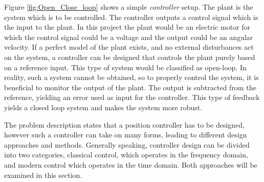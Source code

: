 \documentclass[../../main.tex]{subfiles}
\begin{document}
Figure \ref{fig:Open_Close_loop} shows a simple \textit{controller} setup.
The plant is the system which is to be controlled. The controller outputs a control signal which is the input to the plant. 
In this project the plant would be an electric motor for which the control signal could be a voltage and the output could be an angular velocity.
If a perfect model of the plant exists, and no external disturbances act on the system, a controller can be designed that controls the plant purely based on a reference input. This type of system would be classified as open-loop. In reality, such a system cannot be obtained, so to properly control the system, it is beneficial to monitor the output of the plant. The output is subtracted from the reference, yielding an error used as input for the controller. This type of feedback yields a closed loop system and makes the system more robust. 

The problem description states that a position controller has to be designed, however such a controller can take on many forms, leading to different design approaches and methods. Generally speaking, controller design can be divided into two categories, classical control, which operates in the frequency domain, and modern control which operates in the time domain. Both approaches will be examined in this section.









\end{document}
